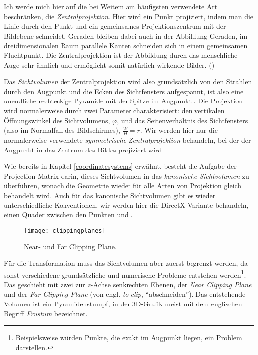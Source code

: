 Ich werde mich hier auf die bei Weitem am häufigsten verwendete Art beschränken, die \emph{Zentralprojektion}. Hier wird ein Punkt projiziert, indem man die Linie durch den Punkt und ein gemeinsames Projektionszentrum mit der Bildebene schneidet. Geraden bleiben dabei auch in der Abbildung Geraden, im dreidimensionalen Raum parallele Kanten schneiden sich in einem gemeinsamen Fluchtpunkt. Die Zentralprojektion ist der Abbildung durch das menschliche Auge sehr ähnlich und ermöglicht somit natürlich wirkende Bilder. (\vgl \citep{wiki:zentralprojektion})


Das \emph{Sichtvolumen} der Zentralprojektion wird also grundsätzlich von den Strahlen durch den Augpunkt und die Ecken des Sichtfensters aufgespannt, ist also eine unendliche rechteckige Pyramide mit der Spitze im Augpunkt . Die Projektion wird normalerweise durch zwei Parameter charakterisiert: den vertikalen Öffnungswinkel des Sichtvolumens, $\varphi$, und das Seitenverhältnis des Sichtfensters (also im Normalfall des Bildschirmes), $\frac{W}{H} = r$. Wir werden hier nur die normalerweise verwendete \emph{symmetrische Zentralprojektion} behandeln, bei der der Augpunkt in das Zentrum des Bildes projiziert wird.

Wie bereits in Kapitel \ref{coordinatesystems} erwähnt, besteht die Aufgabe der Projection Matrix darin, dieses Sichtvolumen in das \emph{kanonische Sichtvolumen} zu überführen, wonach die Geometrie wieder für alle Arten von Projektion gleich behandelt wird. Auch für das kanonische Sichtvolumen gibt es wieder unterschiedliche Konventionen, wir werden hier die DirectX-Variante behandeln, einen Quader zwischen den Punkten  und .

\begin{wrapfigure}{r}{0.5\textwidth}
  \texttt{[image: clippingplanes]}
  \caption{Near- und Far Clipping Plane.}
  \label{clippingplanes}
\end{wrapfigure}

Für die Transformation muss das Sichtvolumen aber zuerst begrenzt werden, da sonst verschiedene grundsätzliche und numerische Probleme entstehen werden\footnote{Beispielsweise würden Punkte, die exakt im Augpunkt liegen, ein Problem darstellen.}. Das geschieht mit zwei zur $z$-Achse senkrechten Ebenen, der \emph{Near Clipping Plane} und der \emph{Far Clipping Plane} (von engl. \emph{to clip}, \enquote{abschneiden}). Das entstehende Volumen ist ein Pyramidenstumpf, in der 3D-Grafik meist mit dem englischen Begriff \emph{Frustum} bezeichnet.

